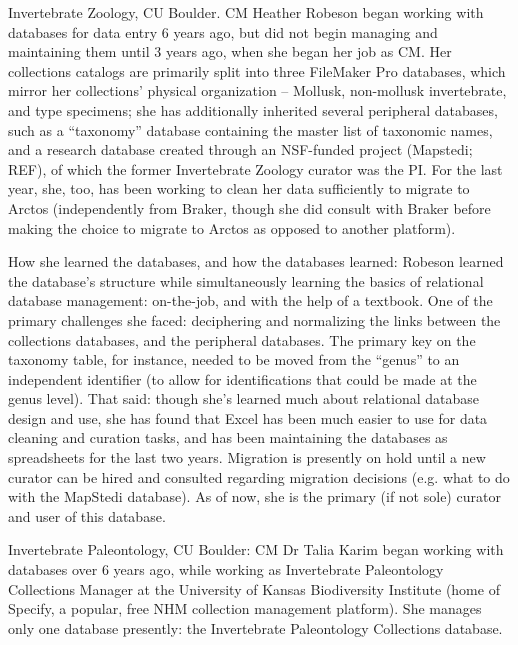Invertebrate Zoology, CU Boulder. CM Heather Robeson began working with databases for data entry 6 years ago, but did not begin managing and maintaining them until 3 years ago, when she began her job as CM.  Her collections catalogs are primarily split into three FileMaker Pro databases, which mirror her collections’ physical organization -- Mollusk, non-mollusk invertebrate, and type specimens; she has additionally inherited several peripheral databases, such as a “taxonomy” database containing the master list of taxonomic names, and a research database created through an NSF-funded project (Mapstedi; REF), of which the former Invertebrate Zoology curator was the PI.  For the last year, she, too, has been working to clean her data sufficiently to migrate to Arctos (independently from Braker, though she did consult with Braker before making the choice to migrate to Arctos as opposed to another platform). 

 How she learned the databases, and how the databases learned: Robeson learned the database’s structure while simultaneously learning the basics of relational database management: on-the-job, and with the help of a textbook. One of the primary challenges she faced: deciphering and normalizing the links between the collections databases, and the peripheral databases.  The primary key on the taxonomy table, for instance, needed to be moved from the “genus” to an independent identifier (to allow for identifications that could be made at the genus level).  That said: though she’s learned much about relational database design and use, she has found that Excel has been much easier to use for data cleaning and curation tasks, and has been maintaining the databases as spreadsheets for the last two years.  Migration is presently on hold until a new curator can be hired and consulted regarding migration decisions (e.g. what to do with the MapStedi database).  As of now, she is the primary (if not sole) curator and user of this database.

Invertebrate Paleontology, CU Boulder: CM Dr Talia Karim began working with databases over 6 years ago, while working as Invertebrate Paleontology Collections Manager at the University of Kansas Biodiversity Institute (home of Specify, a popular, free NHM collection management platform). She manages only one database presently: the Invertebrate Paleontology Collections database.

